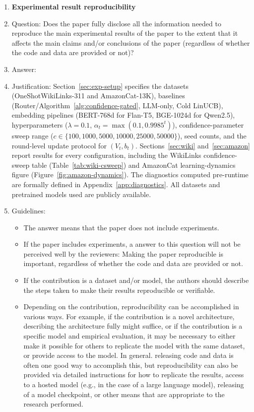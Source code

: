 \documentclass{article}
\theoremstyle{definition}
\theoremstyle{remark}
\theoremstyle{remark}
\begin{document}
\begin{enumerate}
    \item {\bf Experimental result reproducibility}
    \item[] Question: Does the paper fully disclose all the information needed to reproduce the main experimental results of the paper to the extent that it affects the main claims and/or conclusions of the paper (regardless of whether the code and data are provided or not)?
    \item[] Answer: \answerYes{} %
    \item[] Justification: Section~\ref{sec:exp-setup} specifies the datasets (OneShotWikiLinks-311 and AmazonCat-13K), baselines (Router/Algorithm~\ref{alg:confidence-gated}, LLM-only, Cold LinUCB), embedding pipelines (BERT-768d for Flan-T5, BGE-1024d for Qwen2.5), hyperparameters ($\lambda=0.1$, $\alpha_t=\max(0.1, 0.9985^t)$), confidence-parameter sweep range ($c\in\{100, 1000, 5000, 10000, 25000, 50000\}$), seed counts, and the round-level update protocol for $(V_t,b_t)$. Sections~\ref{sec:wiki} and~\ref{sec:amazon} report results for every configuration, including the WikiLinks confidence-sweep table (Table~\ref{tab:wiki-csweep}) and AmazonCat learning-dynamics figure (Figure~\ref{fig:amazon-dynamics}). The diagnostics computed pre-runtime are formally defined in Appendix~\ref{app:diagnostics}. All datasets and pretrained models used are publicly available.
    \item[] Guidelines:
    \begin{itemize}
        \item The answer \answerNA{} means that the paper does not include experiments.
        \item If the paper includes experiments, a \answerNo{} answer to this question will not be perceived well by the reviewers: Making the paper reproducible is important, regardless of whether the code and data are provided or not.
        \item If the contribution is a dataset and\slash or model, the authors should describe the steps taken to make their results reproducible or verifiable. 
        \item Depending on the contribution, reproducibility can be accomplished in various ways. For example, if the contribution is a novel architecture, describing the architecture fully might suffice, or if the contribution is a specific model and empirical evaluation, it may be necessary to either make it possible for others to replicate the model with the same dataset, or provide access to the model. In general. releasing code and data is often one good way to accomplish this, but reproducibility can also be provided via detailed instructions for how to replicate the results, access to a hosted model (e.g., in the case of a large language model), releasing of a model checkpoint, or other means that are appropriate to the research performed.

\end{itemize}
\end{enumerate}
\end{document}
